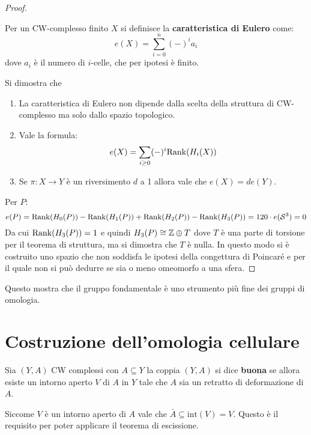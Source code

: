 \begin{proof}
  \begin{definition}
    Per un CW-complesso finito $ X $ si definisce la \textbf{caratteristica di Eulero}
    come:
    \[
      e(X) = \sum_{i = 0}^n (-)^i a_i
    \]
    dove $ a_i $ è il numero di $ i $-celle, che per ipotesi è finito.
  \end{definition}
  Si dimostra che
  \begin{enumerate}
  \item La caratteristica di Eulero non dipende dalla scelta della struttura
    di CW-complesso ma solo dallo spazio topologico.
  \item Vale la formula:
    \[
      e(X) = \sum_{i\geq0}(-)^i \mathrm{Rank}( H_i(X) )
    \]
  \item Se $ \pi \colon X \to Y $ è un riversimento $ d $ a 1 allora vale che $ e(X) = d e(Y) $.
  \end{enumerate}
  Per $ P $:
  \[
    e(P) = \mathrm{Rank}( H_0(P) ) - \mathrm{Rank}( H_1(P) ) + \mathrm{Rank}( H_2(P) ) - \mathrm{Rank}( H_3(P) ) = 120 \cdot e(\mathcal{S}^{3}) = 0
  \]
  Da cui $ \mathrm{Rank}( H_3(P) ) = 1 $ e quindi $ H_3(P) \cong \mathbb{Z} \oplus T $ dove $ T $ è una
  parte di torsione per il teorema di struttura, ma si dimostra che $ T $ è
  nulla. In questo modo si è costruito uno spazio che non soddisfa le ipotesi
  della congettura di Poincaré e per il quale non si può dedurre se sia o meno
  omeomorfo a una sfera.
\end{proof}
\eproof
Questo mostra che il gruppo fondamentale è uno strumento più fine
dei gruppi di omologia.


\section{Costruzione dell'omologia cellulare}

\begin{definition}
  Sia $ (Y,A) $ CW complessi con $ A \subseteq Y $
  la coppia $ (Y,A) $ si dice \textbf{buona} se
  allora esiste un intorno aperto $ V $ di $ A $ in $ Y $ tale che $ A $
  sia un retratto di deformazione di $ A $.
\end{definition}
\begin{osservation}
  Siccome $ V $ è un intorno aperto di $ A $ vale
  che $ \bar{A} \subseteq \mathrm{int}(V) = V $. Questo è il requisito per poter
  applicare il teorema di escissione.
\end{osservation}

